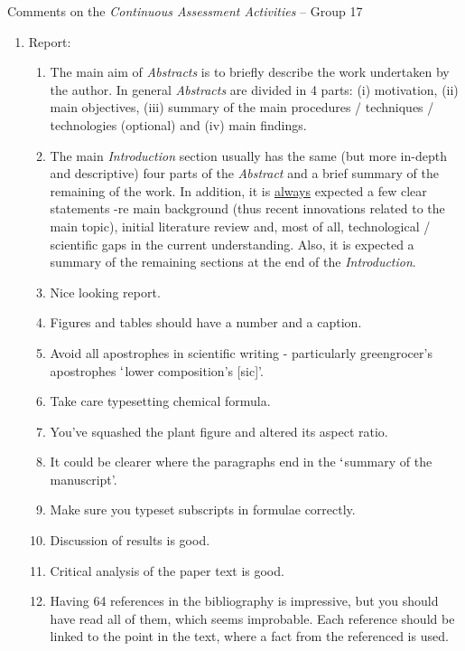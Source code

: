 \documentclass[14pt,twoside]{report}
\begin{document}
\clearpage



\bigskip

\begin{center}
  {\Large Comments on the {\it Continuous Assessment Activities} -- Group 17}
\end{center}

\begin{enumerate}

\item Report:
\begin{enumerate}
%
\item The main aim of {\it Abstracts} is to briefly describe the work undertaken by the author. In general {\it Abstracts} are divided in 4 parts: (i) motivation, (ii) main objectives, (iii) summary of the main procedures / techniques / technologies (optional) and (iv) main findings. 
%
\item The main {\it Introduction} section usually has the same (but more in-depth and descriptive) four parts of the {\it Abstract} and a brief summary of the remaining of the work. In addition, it is \underline{always} expected a few clear statements -re main background (thus recent innovations related to the main topic), initial literature review and, most of all, technological / scientific gaps in the current understanding. Also, it is expected a summary of the remaining sections at the end of the {\it Introduction}.
%
\item Nice looking report.
%
\item Figures and tables should have a number and a caption.
%
\item Avoid all apostrophes in scientific writing - particularly greengrocer's apostrophes $\lq$lower composition's [sic]'.
%
\item Take care typesetting chemical formula.
%
\item You've squashed the plant figure and altered its aspect ratio.
%
\item It could be clearer where the paragraphs end in the $\lq$summary of the manuscript'.
%
\item Make sure you typeset subscripts in formulae correctly.
%
\item Discussion of results is good.
%
\item Critical analysis of the paper text is good.
%
\item Having 64 references in the bibliography is impressive, but you should have read all of them, which seems improbable. Each reference should be linked to the point in the text, where a fact from the referenced is used.

\end{enumerate}
\end{enumerate}
\end{document}
